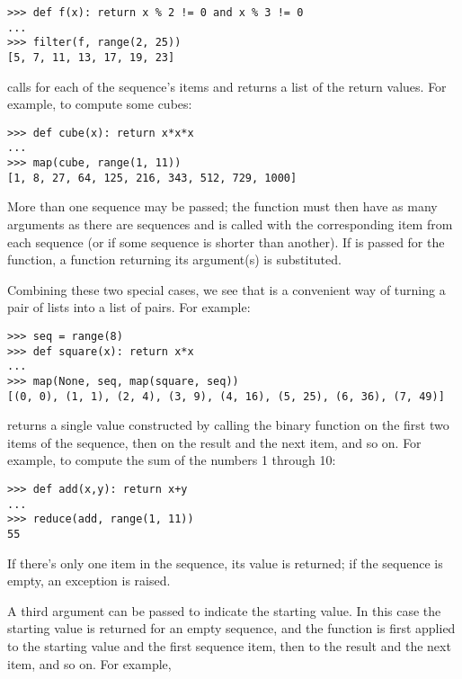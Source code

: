 \documentclass{manual}
\begin{document}
\begin{verbatim}
>>> def f(x): return x % 2 != 0 and x % 3 != 0
...
>>> filter(f, range(2, 25))
[5, 7, 11, 13, 17, 19, 23]
\end{verbatim}

 calls
 for each of the sequence's items and
returns a list of the return values.  For example, to compute some
cubes:

\begin{verbatim}
>>> def cube(x): return x*x*x
...
>>> map(cube, range(1, 11))
[1, 8, 27, 64, 125, 216, 343, 512, 729, 1000]
\end{verbatim}

More than one sequence may be passed; the function must then have as
many arguments as there are sequences and is called with the
corresponding item from each sequence (or  if some sequence
is shorter than another).  If  is passed for the function,
a function returning its argument(s) is substituted.

Combining these two special cases, we see that
 is a convenient way of
turning a pair of lists into a list of pairs.  For example:

\begin{verbatim}
>>> seq = range(8)
>>> def square(x): return x*x
...
>>> map(None, seq, map(square, seq))
[(0, 0), (1, 1), (2, 4), (3, 9), (4, 16), (5, 25), (6, 36), (7, 49)]
\end{verbatim}

 returns a single value
constructed by calling the binary function  on the first two
items of the sequence, then on the result and the next item, and so
on.  For example, to compute the sum of the numbers 1 through 10:

\begin{verbatim}
>>> def add(x,y): return x+y
...
>>> reduce(add, range(1, 11))
55
\end{verbatim}

If there's only one item in the sequence, its value is returned; if
the sequence is empty, an exception is raised.

A third argument can be passed to indicate the starting value.  In this
case the starting value is returned for an empty sequence, and the
function is first applied to the starting value and the first sequence
item, then to the result and the next item, and so on.  For example,
\end{document}
